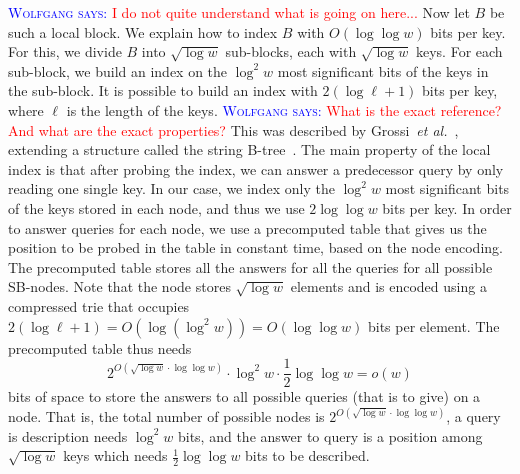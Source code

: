 \documentclass[a4paper,11pt]{article}
\newcommand{\etal}{\emph{et al.}\xspace}
\newcommand{\?}{\mskip1.5mu}
\newcommand{\aremark}[3]{\textcolor{blue}{\textsc{#1 #2:}}
  \textcolor{red}{\textsf{#3}}}
\newcommand{\wolfgang}[2][says]{\aremark{Wolfgang}{#1}{#2}}
\begin{document}
\wolfgang{I do not quite understand what is going on here...}
Now let $B$ be such a local block.
We explain how to index $B$
with $O(\log\log w)$ bits per key. For this, 
we divide $B$ into $\sqrt{\log w}$ sub-blocks, 
each with $\sqrt{\log w}$ keys.  
For each sub-block, we build an index 
on the $\log^2 w$ most significant bits 
of the keys in the sub-block. 
It is possible to build an index with $2(\log\ell+1)$ bits per key, 
where $\ell$ is the length of the keys. 
\wolfgang{What is the exact reference? And what are the
exact properties?}
This was described by Grossi~\etal~\cite{GRR09},
extending a structure called the string B-tree~\cite{FG99}. 
The main property of the local index is that after probing the index, 
we can answer a predecessor query by only reading one single key. 
In our case, we index only the $\log^2 w$ most significant bits 
of the keys stored in each node, and thus  we use $2\log\log w$ bits per key. 
In order to answer queries for each node, we use a precomputed table 
that gives us the position to be probed in the table in constant time, 
based on the node encoding. The precomputed table stores all the answers 
for all the queries for all possible SB-nodes. Note that the node 
stores $\sqrt{\log w}$ elements and is encoded using a compressed 
trie that occupies $2(\log\ell+1)=O(\log(\log^2w))=O(\log\log w)$ bits 
per element. The precomputed table thus needs 
\[
2^{O(\sqrt{\log w}\cdot \log\log w)}\cdot\log^2w\cdot\frac{1}{2}\log\log w
=o(w)
\]
bits of space to store the answers to all possible queries 
(that is to give) on a node. That is, 
the total number of possible nodes is  
$2^{O(\sqrt{\log w}\cdot \log\log w)}$, a query is description needs 
$\log^2w$ bits,  and the answer to query is a position among 
$\sqrt{\log w}$ keys which needs $\frac{1}{2}\log\log w$ bits to be described.
\end{document}
